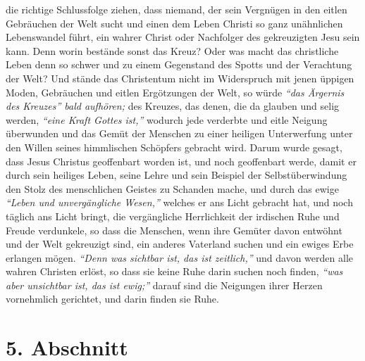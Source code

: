 die richtige Schlussfolge ziehen, dass niemand, der sein Vergnügen in den eitlen
Gebräuchen der Welt sucht und einen dem Leben Christi so ganz unähnlichen
Lebenswandel führt, ein wahrer Christ oder Nachfolger des gekreuzigten Jesu sein
kann. Denn worin bestände sonst das Kreuz? Oder was macht das christliche
Leben denn so schwer und zu einem Gegenstand des Spotts und der Verachtung der
Welt? Und stände das Christentum nicht im Widerspruch mit jenen üppigen Moden,
Gebräuchen und eitlen Ergötzungen der Welt, so würde
\textit{"`das Ärgernis des Kreuzes"' bald aufhören;}
des Kreuzes, das denen, die da glauben und
selig werden,
\textit{"`eine Kraft Gottes ist,"'}
wodurch jede
verderbte und eitle Neigung überwunden und das Gemüt der Menschen zu einer
heiligen Unterwerfung unter den Willen seines himmlischen Schöpfers gebracht
wird. Darum wurde gesagt, dass Jesus Christus geoffenbart worden ist, und noch
geoffenbart werde, damit er durch sein heiliges Leben, seine Lehre und sein
Beispiel der Selbstüberwindung den Stolz des menschlichen Geistes zu Schanden
mache,
und durch das ewige \textit{"`Leben und unvergängliche
Wesen,"'} welches er ans Licht gebracht hat, und noch täglich ans
Licht bringt,
die vergängliche Herrlichkeit der irdischen Ruhe und Freude
verdunkele,
so dass die Menschen, wenn ihre
Gemüter davon entwöhnt und der Welt gekreuzigt sind, ein anderes Vaterland
suchen und ein ewiges Erbe erlangen mögen.
\textit{"`Denn was sichtbar ist, das ist zeitlich,"'}
und davon werden alle wahren Christen erlöst,
so dass sie keine Ruhe darin suchen noch finden,
\textit{"`was aber unsichtbar ist, das
ist ewig;"'} darauf sind die Neigungen ihrer Herzen vornehmlich gerichtet, und
darin finden sie Ruhe.

\section{5. Abschnitt} \label{kap16_ab5}


